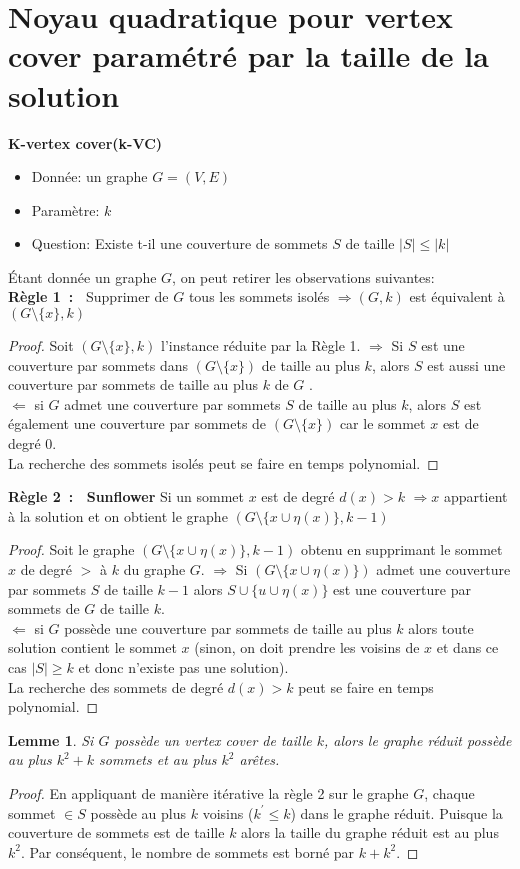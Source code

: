 \documentclass[a4paper, 12pt]{article}
\newtheorem{lem}{Lemme}
\begin{document}
\section{Noyau quadratique pour vertex cover paramétré par la taille de la solution}
\textbf{K-vertex cover(k-VC)}
\begin{itemize}
\item Donnée: un graphe $G=(V,E)$
\item Paramètre: $k$
\item Question: Existe t-il une couverture de sommets $S$ de taille $\vert S \vert \leqslant \vert k \vert$
\end{itemize}
Étant donnée un graphe $G$, on peut retirer les observations suivantes:\\
\textbf{Règle 1~:~} Supprimer de $G$ tous les sommets isolés $ \Rightarrow (G,k)$ est équivalent à $(G \setminus \lbrace x \rbrace,k)$
\begin{proof}
Soit $(G \setminus \lbrace x \rbrace,k)$ l'instance réduite par la Règle 1. $ \Rightarrow$ Si $S$ est une couverture par sommets dans $(G \setminus \lbrace x\rbrace )$ de taille au plus $k$, alors $S$ est aussi une couverture par sommets de taille au plus $k$ de $G$ . \\
$\Leftarrow$ si $G$ admet une couverture par sommets $S$ de taille au plus $k$, alors $S$ est également une couverture par sommets de $(G \setminus \lbrace x \rbrace)$ car le sommet $x$ est de degré 0.\\
La recherche des sommets isolés peut se faire en temps polynomial.
\end{proof}
\textbf{Règle 2~:~ Sunflower} Si un sommet $x$ est de degré $d(x) > k$ $ \Rightarrow x$ appartient à la solution et on obtient le graphe $(G \setminus \lbrace x \cup \eta(x) \rbrace,k-1)$ 
\begin{proof}
Soit le graphe $(G \setminus \lbrace x \cup \eta(x) \rbrace,k-1)$ obtenu en supprimant le sommet $x$ de degré $>$ à $k$ du graphe $G$. 
$ \Rightarrow $ Si $(G \setminus \lbrace x \cup \eta(x) \rbrace)$ admet une couverture par sommets $S$ de taille $k-1$ alors $S \cup \lbrace u \cup \eta(x) \rbrace$ est une couverture par sommets de $G$ de taille $k$. \\
$ \Leftarrow $ si $G$ possède une couverture par sommets de taille au plus $k$ alors toute solution contient le sommet $x$ (sinon, on doit prendre les voisins de $x$ et dans ce cas $ \vert S \vert \geqslant k$ et donc n'existe pas une solution).\\
La recherche des sommets de degré $d(x)>k$ peut se faire en temps polynomial.
\end{proof}
\begin{lem}
Si $G$ possède un vertex cover de taille $k$, alors le graphe réduit possède au plus $k^{2} + k$ sommets et au plus 
$k^{ 2}$ arêtes.
\end{lem}
\begin{proof}
En appliquant de manière itérative la règle 2 sur le graphe $G$, chaque sommet $\in S$ possède au plus $k$ voisins ($k^{'}\leqslant k$) dans le graphe réduit. Puisque la couverture de sommets est de taille $k$ alors la taille du graphe réduit est au plus $k^{2}$. Par conséquent, le nombre de sommets est borné par $k+k^{2}$.    
\end{proof}
\end{document}
